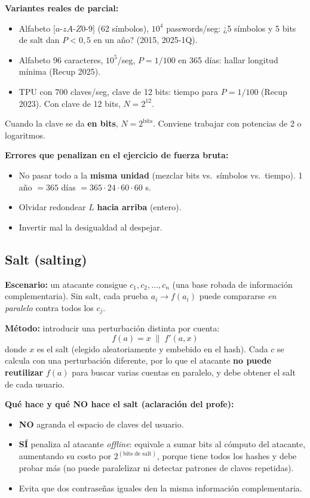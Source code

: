 \documentclass[../main.tex]{subfiles}
\begin{document}
\begin{examen}
\textbf{Variantes reales de parcial:}
\begin{itemize}[itemsep=1pt]
  \item Alfabeto $[a$-$zA$-$Z0$-$9]$ (62 símbolos), $10^4$ passwords/seg: ¿5 símbolos y 5 bits de salt dan $P<0{,}5$ en un año? (2015, 2025-1Q).
  \item Alfabeto 96 caracteres, $10^5$/seg, $P=1/100$ en 365 días: hallar longitud mínima (Recup 2025).
  \item TPU con 700 claves/seg, clave de 12 bits: tiempo para $P=1/100$ (Recup 2023). Con clave de 12 bits, $N=2^{12}$.
\end{itemize}
Cuando la clave se da \textbf{en bits}, $N=2^{\text{bits}}$. Conviene trabajar con potencias de 2 o logaritmos.
\end{examen}

\begin{ojo}
\textbf{Errores que penalizan en el ejercicio de fuerza bruta:}
\begin{itemize}[itemsep=1pt]
  \item No pasar todo a la \textbf{misma unidad} (mezclar bits vs.\ símbolos vs.\ tiempo). 1 año $=365$ días $=365\cdot24\cdot60\cdot60$ s.
  \item Olvidar redondear $L$ \textbf{hacia arriba} (entero).
  \item Invertir mal la desigualdad al despejar.
\end{itemize}
\end{ojo}

\subsection{Salt (salting)}

\textbf{Escenario:} un atacante consigue $c_1,c_2,\dots,c_n$ (una base robada de información complementaria). Sin salt, cada prueba $a_i \to f(a_i)$ puede compararse \emph{en paralelo} contra todos los $c_j$.

\textbf{Método:} introducir una perturbación distinta por cuenta:
$$f(a) = x \;\|\; f'(a,x)$$
donde $x$ es el salt (elegido aleatoriamente y embebido en el hash). Cada $c$ se calcula con una perturbación diferente, por lo que el atacante \textbf{no puede reutilizar} $f(a)$ para buscar varias cuentas en paralelo, y debe obtener el salt de cada usuario.

\begin{destacado}
\textbf{Qué hace y qué NO hace el salt (aclaración del profe):}
\begin{itemize}[itemsep=1pt]
  \item \textbf{NO} agranda el espacio de claves del usuario.
  \item \textbf{SÍ} penaliza al atacante \emph{offline}: equivale a sumar bits al cómputo del atacante, aumentando su costo por $2^{(\text{bits de salt})}$, porque tiene todos los hashes y debe probar más (no puede paralelizar ni detectar patrones de claves repetidas).
  \item Evita que dos contraseñas iguales den la misma información complementaria.
\end{itemize}
\end{destacado}
\end{document}
